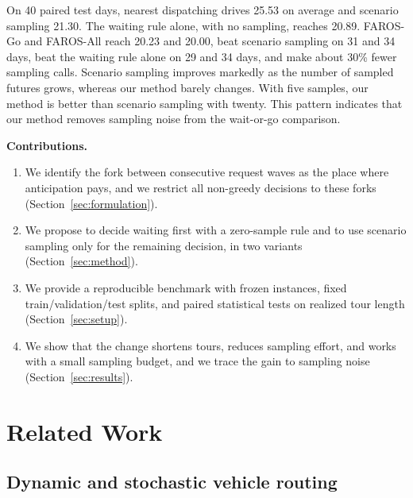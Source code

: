 \documentclass[5p,times,authoryear]{elsarticle}
\begin{document}
On 40 paired test days, nearest dispatching drives 25.53 on average and scenario sampling 21.30. The waiting rule alone, with no sampling, reaches 20.89. FAROS-Go and FAROS-All reach 20.23 and 20.00, beat scenario sampling on 31 and 34 days, beat the waiting rule alone on 29 and 34 days, and make about 30\% fewer sampling calls. Scenario sampling improves markedly as the number of sampled futures grows, whereas our method barely changes. With five samples, our method is better than scenario sampling with twenty. This pattern indicates that our method removes sampling noise from the wait-or-go comparison.

\noindent\textbf{Contributions.}
\begin{enumerate}[leftmargin=*,nosep,topsep=2pt]
\item We identify the fork between consecutive request waves as the place where anticipation pays, and we restrict all non-greedy decisions to these forks (Section~\ref{sec:formulation}).
\item We propose to decide waiting first with a zero-sample rule and to use scenario sampling only for the remaining decision, in two variants (Section~\ref{sec:method}).
\item We provide a reproducible benchmark with frozen instances, fixed train/validation/test splits, and paired statistical tests on realized tour length (Section~\ref{sec:setup}).
\item We show that the change shortens tours, reduces sampling effort, and works with a small sampling budget, and we trace the gain to sampling noise (Section~\ref{sec:results}).
\end{enumerate}

\section{Related Work}
\label{sec:related}

\subsection{Dynamic and stochastic vehicle routing}
\end{document}
